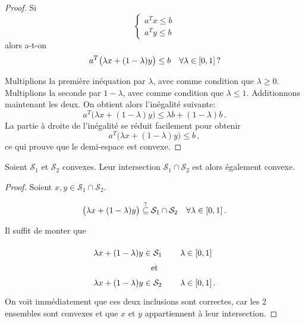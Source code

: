 	\begin{mytheo}\label{theo:demi-espace}\leavevmode
		\begin{proof}
			Si
			\[
			\left\{
			\begin{array}{c}
				a^T x \le b\\
				a^T y \le b
			\end{array}
			\right.
			\]
			alors a-t-on
			\[
			a^T \big(\lambda x + (1 - \lambda)y\big) \le b
			\quad \forall \lambda \in \interval{0}{1}\,?
			\]

			Multiplions la première inéquation par $\lambda$,
			avec comme condition que $\lambda \ge 0$.
			Multiplions la seconde par $1-\lambda$,
			avec comme condition que $\lambda \le 1$.
			Additionnons maintenant les deux.
			On obtient alors l'inégalité suivante:
			\[
			a^T \big(\lambda x + (1 - \lambda)y\big) \le
			\lambda b + (1-\lambda) b\,.
			\]
			La partie à droite de l'inégalité se réduit facilement
			pour obtenir
			\[
			a^T \big(\lambda x + (1 - \lambda)y\big) \le b\,,
			\]
			ce qui prouve que le demi-espace est convexe.
		\end{proof}
	\end{mytheo}

	\begin{mytheo}\label{theo:inter}\leavevmode
		Soient $\mathcal{S}_1$ et $\mathcal{S}_2$ convexes.
		Leur intersection $\mathcal{S}_1 \cap \mathcal{S}_2$
		est alors également convexe.

		\begin{proof}
			Soient $x,y \in \mathcal{S}_1 \cap \mathcal{S}_2$.

			\[
			\big(\lambda x + (1 - \lambda)y\big) \overset{?}{\subseteq} \mathcal{S}_1 \cap \mathcal{S}_2
			\quad \forall \lambda \in \interval{0}{1}\,.
			\]

			Il suffit de monter que

			\[
			\renewcommand{\arraystretch}{1.5}
			\begin{tabular}{cl}
				$\lambda x + (1 - \lambda)y \in \mathcal{S}_1$ &
				$\quad \lambda \in \interval{0}{1}$\\
				\multicolumn{2}{c}{et}\\
				$\lambda x + (1 - \lambda)y \in \mathcal{S}_2$ &
				$\quad \lambda \in \interval{0}{1}\,.$\\
			\end{tabular}
			\]
			On voit immédiatement
			que ces deux inclusions sont correctes,
			car les 2 ensembles sont convexes
			et que $x$ et $y$ appartiennent à leur intersection.
		\end{proof}
	\end{mytheo}

